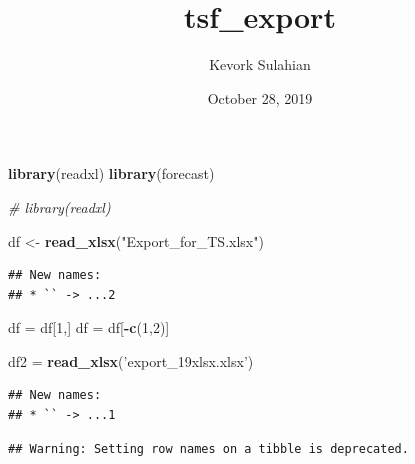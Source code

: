 \documentclass[
]{article}
\title{tsf\_export}
\author{Kevork Sulahian}
\date{October 28, 2019}
\newenvironment{Shaded}{\begin{snugshade}}{\end{snugshade}}
\newcommand{\CommentTok}[1]{\textcolor[rgb]{0.56,0.35,0.01}{\textit{#1}}}
\newcommand{\DecValTok}[1]{\textcolor[rgb]{0.00,0.00,0.81}{#1}}
\newcommand{\KeywordTok}[1]{\textcolor[rgb]{0.13,0.29,0.53}{\textbf{#1}}}
\newcommand{\NormalTok}[1]{#1}
\newcommand{\OperatorTok}[1]{\textcolor[rgb]{0.81,0.36,0.00}{\textbf{#1}}}
\newcommand{\StringTok}[1]{\textcolor[rgb]{0.31,0.60,0.02}{#1}}
\begin{document}
\maketitle

\begin{Shaded}
\begin{Highlighting}[]
\KeywordTok{library}\NormalTok{(readxl)}
\KeywordTok{library}\NormalTok{(forecast)}
\end{Highlighting}
\end{Shaded}

\begin{Shaded}
\begin{Highlighting}[]
\CommentTok{# library(readxl)}

\NormalTok{df <-}\StringTok{ }\KeywordTok{read_xlsx}\NormalTok{(}\StringTok{"Export_for_TS.xlsx"}\NormalTok{)}
\end{Highlighting}
\end{Shaded}

\begin{verbatim}
## New names:
## * `` -> ...2
\end{verbatim}

\begin{Shaded}
\begin{Highlighting}[]
\NormalTok{df =}\StringTok{ }\NormalTok{df[}\DecValTok{1}\NormalTok{,]}
\NormalTok{df =}\StringTok{ }\NormalTok{df[}\OperatorTok{-}\KeywordTok{c}\NormalTok{(}\DecValTok{1}\NormalTok{,}\DecValTok{2}\NormalTok{)]}

\NormalTok{df2 =}\StringTok{ }\KeywordTok{read_xlsx}\NormalTok{(}\StringTok{'export_19xlsx.xlsx'}\NormalTok{)}
\end{Highlighting}
\end{Shaded}

\begin{verbatim}
## New names:
## * `` -> ...1
\end{verbatim}

\begin{Shaded}
\end{Shaded}

\begin{verbatim}
## Warning: Setting row names on a tibble is deprecated.
\end{verbatim}
\end{document}
